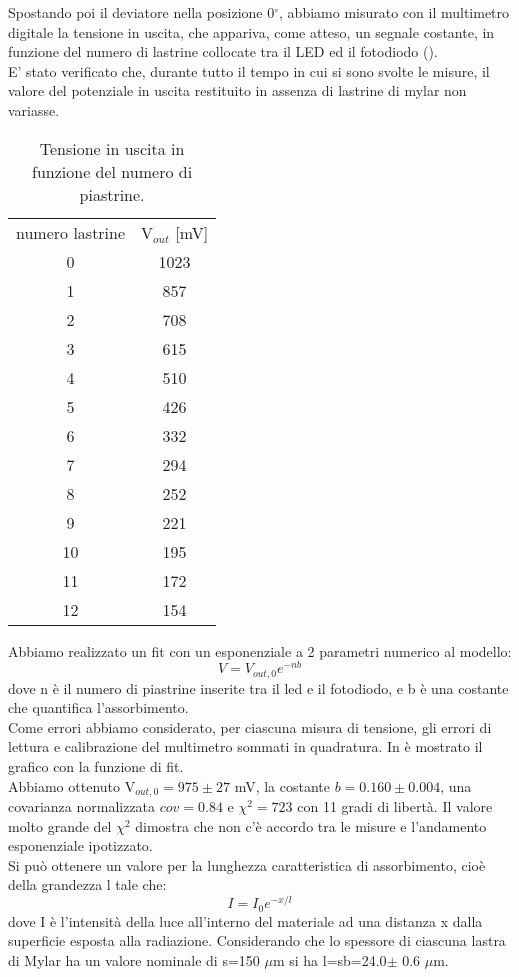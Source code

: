  Spostando poi il deviatore nella posizione 0$^\circ$, abbiamo misurato con il multimetro digitale la tensione in uscita, che appariva, come atteso, un segnale costante, in funzione del numero di lastrine collocate tra il LED ed il fotodiodo ().\\ E' stato verificato che, durante tutto il tempo in cui si sono svolte le misure, il valore del potenziale in uscita restituito in assenza di lastrine di mylar non variasse. 
\begin{table}[h]
	\centering
	\begin{tabular}{cc}		
		{numero lastrine} & {V$_{out}$ [mV]}\\
                      0 & 1023\\
                      1 & 857\\
                      2 & 708\\
                      3 & 615\\
                      4 & 510\\
                      5 & 426\\
                      6 & 332\\
                      7 & 294\\
                      8 & 252\\
                      9 & 221\\
                     10 & 195\\
                     11 & 172\\
                     12 & 154\\
	           \midrule
	
 	\end{tabular}
	\caption{Tensione in uscita in funzione del numero di piastrine. }
	\label{t:Fotodiodo}
\end{table}
Abbiamo realizzato un fit con un esponenziale a 2 parametri numerico al modello:
\begin{equation}
V=V_{out,0}e^{-nb}
\end{equation}
dove n è il numero di piastrine inserite tra il led e il fotodiodo, e b è una costante che quantifica l'assorbimento.\\
 Come errori abbiamo considerato, per ciascuna misura di tensione, gli errori di lettura e calibrazione del multimetro sommati in quadratura. In  è mostrato il grafico con la funzione di fit.\\
Abbiamo ottenuto V$_{out,0} = 975 \pm 27$ mV, la costante $b = 0.160 \pm 0.004$, una covarianza normalizzata $cov = 0.84$ e $\chi^2 = 723$ con 11 gradi di libertà. Il valore molto grande del $\chi^2$ dimostra che non c'è accordo tra le misure e l'andamento esponenziale ipotizzato.\\
Si può ottenere un valore per la lunghezza caratteristica di assorbimento, cioè della grandezza l tale che:
\begin{equation}
I=I_{0}e^{-x/l}
\end{equation}
dove I è l'intensità della luce all'interno del materiale ad una distanza x dalla superficie esposta alla radiazione.
Considerando che lo spessore di ciascuna lastra di Mylar ha un valore nominale di s=150 $\mu$m si ha l=sb=24.0$ \pm$ 0.6 $\mu$m.

